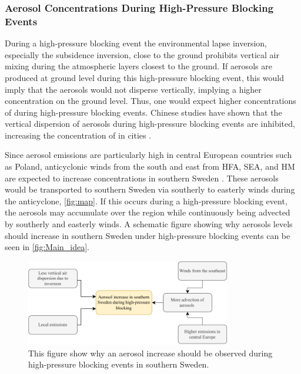 \subsubsection{Aerosol Concentrations During High-Pressure Blocking Events}
During a high-pressure blocking event the environmental lapse inversion, especially the subsidence inversion, close to the ground prohibits vertical air mixing during the atmospheric layers closest to the ground. If aerosols are produced at ground level during this high-pressure blocking event, this would imply that the aerosols would not disperse vertically, implying a higher concentration on the ground level. Thus, one would expect higher concentrations of \PM during high-pressure blocking events. Chinese studies have shown that the vertical dispersion of aerosols during high-pressure blocking events are inhibited, increasing the concentration of \PM in cities \cite{caiImpactBlockingStructure2020}.

Since aerosol emissions are particularly high in central European countries such as Poland, anticyclonic winds from the south and east from HFA, SEA, and HM are expected to increase \PM concentrations in southern Sweden \cite{europeanenvironmentagencyEuropesAirQuality2024}. These aerosols would be transported to southern Sweden via southerly to easterly winds during the anticyclone,  \autoref{fig:map}. If this occurs during a high-pressure blocking event, the aerosols may accumulate over the region while continuously being advected by southerly and easterly winds. A schematic figure showing why aerosols levels should increase in southern Sweden under high-pressure blocking events can be seen in \autoref{fig:Main_idea}. 

\vspace{1cm}

\begin{figure}[H]
    \centering
    \includegraphics[width=0.8\textwidth]{Figures/Main_idea}
    \caption{This figure show why an aerosol increase should be observed during high-pressure blocking events in southern Sweden.}
    \label{fig:Main_idea}
\end{figure}


